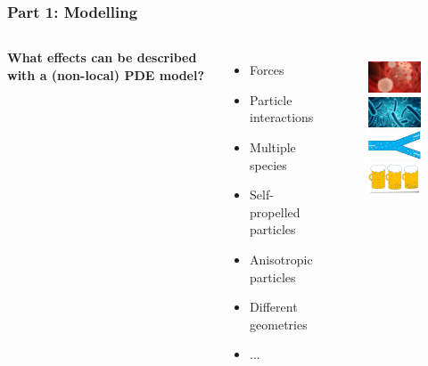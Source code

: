 \documentclass[aspectratio=169,xcolor=dvipsnames]{beamer}
\begin{document}
\begin{frame}
	\frametitle{Part 1: Modelling}
	\begin{columns}
		\textbf{What effects can be described with a (non-local) PDE model?}
		\begin{itemize}
			\item Forces
			\item Particle interactions
			\item Multiple species
			\item Self-propelled particles
			\item Anisotropic particles
			\item Different geometries
			\item ...
		\end{itemize}
		\vspace{-1cm}
		\begin{figure}
			\includegraphics[width=3cm]{bloodcells.jpg}\\
			\includegraphics[width=3cm]{bacteria.png}\\
			\includegraphics[width=3cm]{Microfilter.png}\\
			\includegraphics[width=3cm]{beer.png}
		\end{figure}
	\end{columns}
\end{frame}
\end{document}
